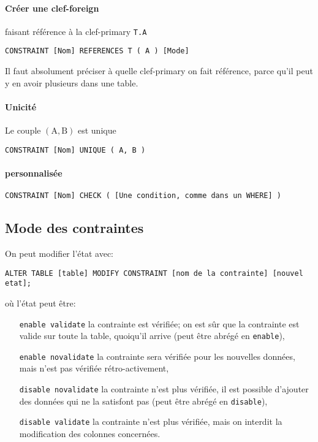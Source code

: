 \documentclass[10pt,a4paper,french]{article}
\begin{document}
\paragraph{Créer une \gls{clef-foreign}} faisant référence à la \gls{clef-primary} {\tt T.A}
\begin{verbatim}
CONSTRAINT [Nom] REFERENCES T ( A ) [Mode]
\end{verbatim}
Il faut absolument préciser à quelle \gls{clef-primary} on fait référence, parce qu'il peut y en avoir plusieurs dans une table.

\paragraph{Unicité} Le couple $( \text{A}, \text{B} )$ est unique
\begin{verbatim}
CONSTRAINT [Nom] UNIQUE ( A, B )
\end{verbatim}

\paragraph{ personnalisée}
\begin{verbatim}
CONSTRAINT [Nom] CHECK ( [Une condition, comme dans un WHERE] )
\end{verbatim}

\subsection{Mode des \glspl{contrainte}}\label{sec:constraint:mode}

On peut modifier l'état avec:
\begin{verbatim}
ALTER TABLE [table] MODIFY CONSTRAINT [nom de la contrainte] [nouvel etat];
\end{verbatim}
où l'état peut être:
\begin{itemize}
\item[\tt \gls{enable} \gls{validate}] la contrainte est vérifiée; on est sûr que la contrainte est valide sur toute la table, quoiqu'il arrive (peut être abrégé en {\tt \gls{enable}}),
\item[\tt \gls{enable} \gls{novalidate}] la contrainte sera vérifiée pour les nouvelles données, mais n'est pas vérifiée rétro-activement,
\item[\tt \gls{disable} \gls{novalidate}] la contrainte n'est plus vérifiée, il est possible d'ajouter des données qui ne la satisfont pas (peut être abrégé en {\tt \gls{disable}}),
\item[\tt \gls{disable} \gls{validate}] la contrainte n'est plus vérifiée, mais on interdit la modification des colonnes concernées.
\end{itemize}
\end{document}
